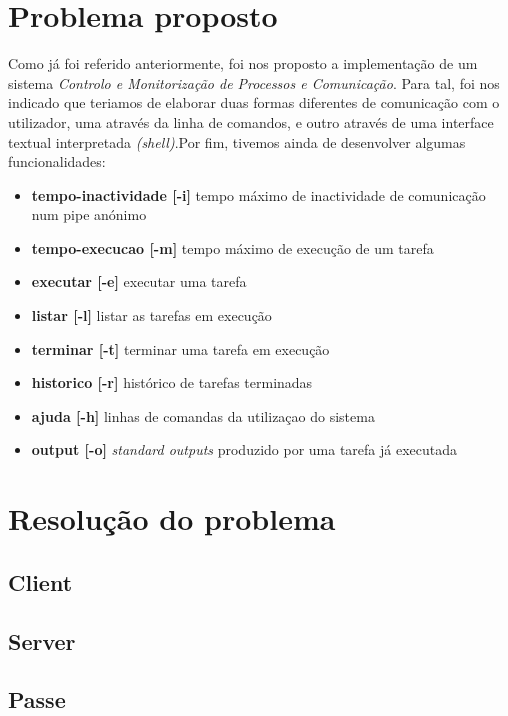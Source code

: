 \documentclass[a4paper]{report}
\begin{document}
\chapter{Problema proposto}\label{chap:Problema proposto}
Como já foi referido anteriormente, foi nos proposto a implementação de um sistema \textit{Controlo e Monitorização de Processos e Comunicação}. Para tal, foi nos indicado que teriamos de elaborar duas formas diferentes de comunicação com o utilizador, uma através da linha de comandos, e outro através de uma interface textual interpretada \textit{(shell)}.Por fim, tivemos ainda de desenvolver algumas funcionalidades:
\begin{itemize}
    \item\textbf {tempo-inactividade [-i]} tempo máximo de inactividade de comunicação num pipe anónimo
    \item\textbf {tempo-execucao [-m]} tempo máximo de execução de um tarefa
    \item\textbf {executar [-e]} executar uma tarefa
    \item\textbf {listar [-l]} listar as tarefas em execução
    \item\textbf {terminar [-t]} terminar uma tarefa em execução
    \item\textbf {historico [-r]} histórico de tarefas terminadas
    \item\textbf {ajuda [-h]} linhas de comandas da utilizaçao do sistema
    \item\textbf {output [-o]} \textit{standard outputs} produzido por uma tarefa já executada
\end{itemize}




\chapter{Resolução do problema}\label{chap:Resolução do problema}

\hypertarget{Client}{}
\section{Client}

\hypertarget{Server}{}
\section{Server}

\hypertarget{Parse}{}
\section{Passe}
\end{document}
